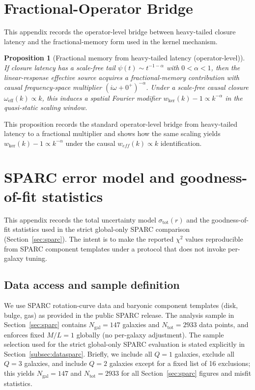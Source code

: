 \documentclass[entropy,article,submit,pdftex,moreauthors]{Definitions/mdpi}
\newtheorem{propositionX}[theoremX]{Proposition}
\begin{document}
\section[\appendixname~\thesection]{Fractional-Operator Bridge}
\label{app:fractional}

This appendix records the operator-level bridge between heavy-tailed closure latency and the fractional-memory form used in the kernel mechanism.

\begin{propositionX}[Fractional memory from heavy-tailed latency (operator-level)]
\label{app:fractional-operator}
If closure latency has a scale-free tail \(\psi(t)\sim t^{-1-\alpha}\) with \(0<\alpha<1\), then the linear-response effective source acquires a fractional-memory contribution with causal frequency-space multiplier \((i\omega+0^+)^{-\alpha}\).
Under a scale-free causal closure \(\omega_{\mathrm{eff}}(k)\propto k\), this induces a spatial Fourier modifier \(w_{\mathrm{ker}}(k)-1\propto k^{-\alpha}\) in the quasi-static scaling window.
\end{propositionX}
This proposition records the standard operator-level bridge from heavy-tailed latency to a fractional multiplier and shows how the same scaling yields 
$w_{\mathrm{ker}}(k)-1\propto k^{-\alpha}$ under the causal $w_{eff}(k)\propto k$ identification.

\section[\appendixname~\thesection]{SPARC error model and goodness-of-fit statistics}
\label{app:sparcmodel}

This appendix records the total uncertainty model \(\sigma_{\mathrm{tot}}(r)\) and the goodness-of-fit
statistics used in the strict global-only SPARC comparison (Section~\ref{sec:sparc}). The intent is to make the
reported \(\chi^2\) values reproducible from SPARC component templates under a protocol that does not
invoke per-galaxy tuning.

\subsection{Data access and sample definition}
We use SPARC rotation-curve data and baryonic component templates (disk, bulge, gas) as provided in the public SPARC release. The analysis sample in Section~\ref{sec:sparc} contains \(N_{\mathrm{gal}}=147\) galaxies and
\(N_{\mathrm{tot}}=2933\) data points, and enforces fixed \(M/L=1\) globally (no per-galaxy adjustment).
The sample selection used for the strict global-only SPARC evaluation is stated explicitly in Section~\ref{subsec:datasparc}.
Briefly, we include all \(Q=1\) galaxies, exclude all \(Q=3\) galaxies, and include \(Q=2\) galaxies except for a fixed list of 16 exclusions; this yields \(N_{\mathrm{gal}}=147\) and \(N_{\mathrm{tot}}=2933\) for all Section~\ref{sec:sparc} figures and misfit statistics.
\end{document}
